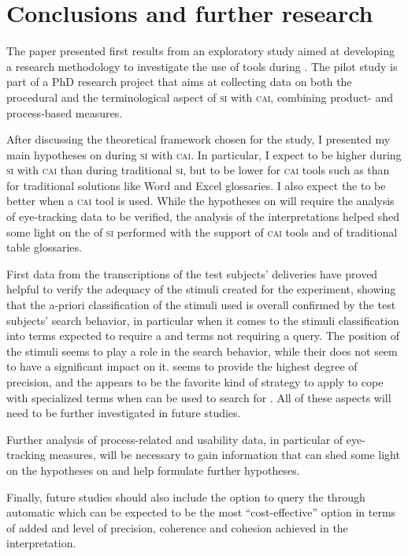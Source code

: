\documentclass[output=paper]{langsci/langscibook}
\begin{document}
\section{Conclusions and further research}\label{sec:prandi:6}
The paper presented first results from an exploratory study aimed at developing a research methodology to investigate the use of  tools during . The pilot study is part of a PhD research project that aims at collecting data on both the procedural and the terminological aspect of \textsc{si} with \textsc{cai}, combining product- and process-based measures. 

After discussing the theoretical framework chosen for the study, I presented my main hypotheses on  during \textsc{si} with \textsc{cai}. In particular, I expect  to be higher during \textsc{si} with \textsc{cai} than during traditional \textsc{si}, but to be lower for \textsc{cai} tools such as  than for traditional  solutions like Word and Excel glossaries. I also expect the  to be better when a \textsc{cai} tool is used. While the hypotheses on  will require the analysis of eye-tracking data to be verified, the analysis of the interpretations helped shed some light on the  of \textsc{si} performed with the support of \textsc{cai} tools and of traditional table glossaries. 

First data from the transcriptions of the test subjects’ deliveries have proved helpful to verify the adequacy of the stimuli created for the experiment, showing that the a-priori classification of the stimuli used is overall confirmed by the test subjects’ search behavior, in particular when it comes to the stimuli classification into terms expected to require a  and terms not requiring a query. The position of the stimuli seems to play a role in the search behavior, while their  does not seem to have a significant impact on it.  seems to provide the highest degree of precision, and the  appears to be the favorite kind of strategy to apply to cope with specialized terms when  can be used to search for . All of these aspects will need to be further investigated in future studies.

Further analysis of process-related and usability data, in particular of eye-tracking measures, will be necessary to gain information that can shed some light on the hypotheses on  and help formulate further hypotheses.

Finally, future studies should also include the option to query the  through automatic  which can be expected to be the most ``cost-effective'' option in terms of  added and level of precision, coherence and cohesion achieved in the interpretation. 
\sloppy
\printbibliography[heading=subbibliography,notkeyword=this] 
\end{document}
